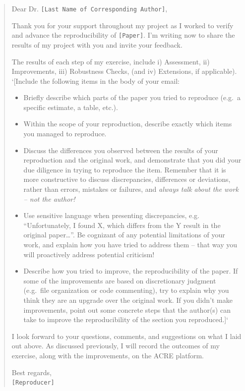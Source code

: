 \documentclass[]{book}
\providecommand{\tightlist}{%
  \setlength{\itemsep}{0pt}\setlength{\parskip}{0pt}}
\begin{document}
\begin{quote}
Dear Dr. \texttt{{[}Last\ Name\ of\ Corresponding\ Author{]}},

Thank you for your support throughout my project as I worked to verify and advance the reproducibility of \texttt{{[}Paper{]}}. I'm writing now to share the results of my project with you and invite your feedback.

The results of each step of my exercise, include i) Assessment, ii) Improvements, iii) Robustness Checks, (and iv) Extensions, if applicable).\\
`{[}Include the following items in the body of your email:

\begin{itemize}
\tightlist
\item
  Briefly describe which parts of the paper you tried to reproduce (e.g.~a specific estimate, a table, etc.).\\
\item
  Within the scope of your reproduction, describe exactly which items you managed to reproduce.\\
\item
  Discuss the differences you observed between the results of your reproduction and the original work, and demonstrate that you did your due diligence in trying to reproduce the item. Remember that it is more constructive to discuss discrepancies, differences or deviations, rather than errors, mistakes or failures, and \emph{always talk about the work -- not the author!}\\
\item
  Use sensitive language when presenting discrepancies, e.g. ``Unfortunately, I found X, which differs from the Y result in the original paper\ldots{}''. Be cognizant of any potential limitations of your work, and explain how you have tried to address them -- that way you will proactively address potential criticism!\\
\item
  Describe how you tried to improve, the reproducibility of the paper. If some of the improvements are based on discretionary judgment (e.g.~file organization or code commenting), try to explain why you think they are an upgrade over the original work. If you didn't make improvements, point out some concrete steps that the author(s) can take to improve the reproducibility of the section you reproduced.{]}`
\end{itemize}

I look forward to your questions, comments, and suggestions on what I laid out above. As discussed previously, I will record the outcomes of my exercise, along with the improvements, on the ACRE platform.

Best regards,\\
\texttt{{[}Reproducer{]}}
\end{quote}
\end{document}
